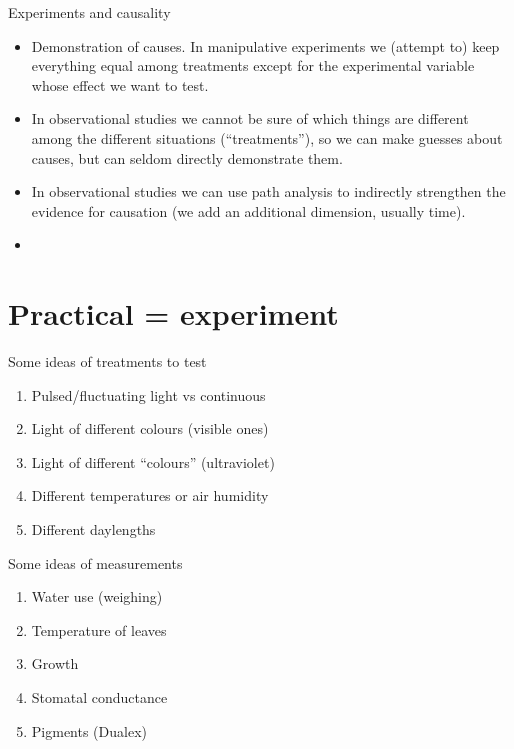 \documentclass[10pt]{beamer}
\begin{document}
\begin{frame}{Experiments and causality}
\begin{itemize}
\item Demonstration of causes. In manipulative experiments we (attempt to) keep
everything equal among treatments except for the experimental
variable whose effect we want to test.

\item In observational studies we cannot be sure of which things
are different among the different situations (``treatments''), so we
can make guesses about causes, but can seldom directly demonstrate them.

\item In observational studies we can use path analysis to indirectly strengthen the evidence for causation (we add an additional dimension, usually time).

\item \DExamples

\end{itemize}
\end{frame}

\section{Practical = experiment}

\begin{frame}{Some ideas of treatments to test}
\begin{enumerate}
  \item Pulsed/fluctuating light vs continuous
  \item Light of different colours (visible ones)
  \item Light of different ``colours'' (ultraviolet)
  \item Different temperatures or air humidity
  \item Different daylengths
\end{enumerate}

\end{frame}

\begin{frame}{Some ideas of measurements}
\begin{enumerate}
  \item Water use (weighing)
  \item Temperature of leaves
  \item Growth
  \item Stomatal conductance
  \item Pigments (Dualex)
\end{enumerate}

\end{frame}
\end{document}
